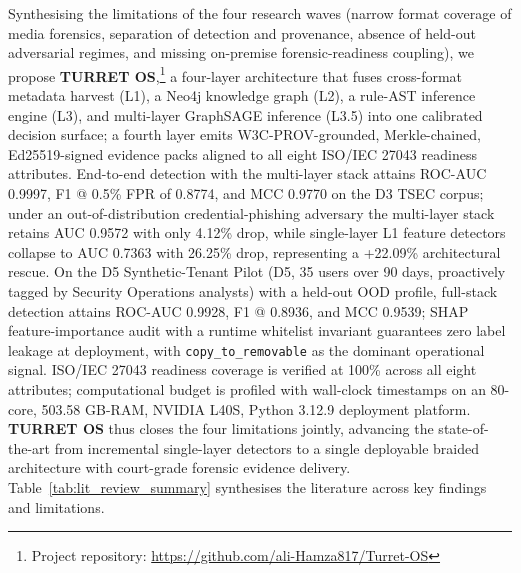 Synthesising the limitations of the four research waves (narrow format coverage of media forensics, separation of detection and provenance, absence of held-out adversarial regimes, and missing on-premise forensic-readiness coupling), we propose \textbf{TURRET OS},\footnote{Project repository: \url{https://github.com/ali-Hamza817/Turret-OS}} a four-layer architecture that fuses cross-format metadata harvest (L1), a Neo4j knowledge graph (L2), a rule-AST inference engine (L3), and multi-layer GraphSAGE inference (L3.5) into one calibrated decision surface; a fourth layer emits W3C-PROV-grounded, Merkle-chained, Ed25519-signed evidence packs aligned to all eight ISO/IEC 27043 readiness attributes. End-to-end detection with the multi-layer stack attains ROC-AUC 0.9997, F1 @ 0.5\% FPR of 0.8774, and MCC 0.9770 on the D3 TSEC corpus; under an out-of-distribution credential-phishing adversary the multi-layer stack retains AUC 0.9572 with only 4.12\% drop, while single-layer L1 feature detectors collapse to AUC 0.7363 with 26.25\% drop, representing a +22.09\% architectural rescue. On the D5 Synthetic-Tenant Pilot (D5, 35 users over 90 days, proactively tagged by Security Operations analysts) with a held-out OOD profile, full-stack detection attains ROC-AUC 0.9928, F1 @ 0.8936, and MCC 0.9539; SHAP feature-importance audit with a runtime whitelist invariant guarantees zero label leakage at deployment, with \texttt{copy\_to\_removable} as the dominant operational signal. ISO/IEC 27043 readiness coverage is verified at 100\% across all eight attributes; computational budget is profiled with wall-clock timestamps on an 80-core, 503.58 GB-RAM, NVIDIA L40S, Python 3.12.9 deployment platform. \textbf{TURRET OS} thus closes the four limitations jointly, advancing the state-of-the-art from incremental single-layer detectors to a single deployable braided architecture with court-grade forensic evidence delivery. Table~\ref{tab:lit_review_summary} synthesises the literature across key findings and limitations.

